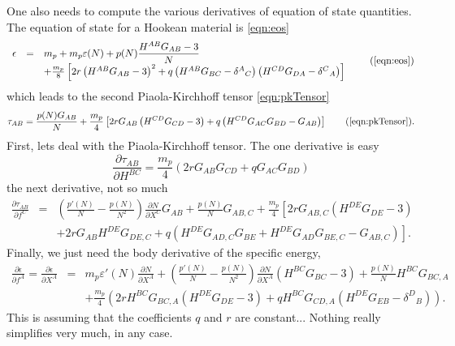 One also needs to compute the various derivatives of equation of state
quantities. The equation of state for a Hookean material is
\eqref{eqn:eos}
\begin{equation}
\begin{array}{rcl}
\epsilon & = & \displaystyle{m_p + m_p\varepsilon(N) + p(N)\frac{H^{AB}G_{AB}-3}{N}} \\
 && + \frac{m_p}{8}\left[ 2r\left(H^{AB}G_{AB}-3\right)^2 + q\left(H^{AB}G_{BC} - \delta^{A}{}_C\right)\left(H^{CD}G_{DA} - \delta^{C}{}_A\right) \right]
 \end{array} \tag{\ref{eqn:eos}}
\end{equation}
which leads to the second Piaola-Kirchhoff tensor \eqref{eqn:pkTensor}
\begin{equation}
\tau_{AB} = \frac{p(N)G_{AB}}{N} +
\frac{m_p}{4}\left[2rG_{AB}\left(H^{CD}G_{CD}-3\right) +
q\left(H^{CD}G_{AC}G_{BD} - G_{AB} \right) \right]
\tag{\ref{eqn:pkTensor}}.
\end{equation}
First, lets deal with the Piaola-Kirchhoff tensor. The one derivative is
easy
\begin{equation}
\frac{\partial \tau_{AB}}{\partial H^{BC}} = 
\frac{m_p}{4}\left(2rG_{AB} G_{CD} +
q G_{AC}G_{BD} \right)
\end{equation}
the next derivative, not so much
\begin{eqnarray}
\nonumber\frac{\partial \tau_{AB}}{\partial f^C} & = & \left( \frac{p'(N)}{N} -
\frac{p(N)}{N^2}\right)\frac{\partial N}{\partial X^C}G_{AB} +
\frac{p(N)}{N} G_{AB,C} +
\frac{m_p}{4}\left[2rG_{AB,C}\left(H^{DE}G_{DE}-3\right)\right. \\
&& \left. + 2rG_{AB}H^{DE}G_{DE,C} +
q\left(H^{DE}G_{AD,C}G_{BE} + H^{DE}G_{AD}G_{BE,C} - G_{AB,C} \right)
\right].
\end{eqnarray}
Finally, we just need the body derivative of the specific energy,
\begin{eqnarray}
\nonumber\frac{\partial \epsilon}{\partial f^A} = \frac{\partial \epsilon}{\partial X^A} & = &
m_p\varepsilon'(N)\frac{\partial N}{\partial X^A} + \left( \frac{p'(N)}{N} - \frac{p(N)}{N^2}\right)
\frac{\partial N}{\partial X^A}(H^{BC}G_{BC} - 3) +
\frac{p(N)}{N}H^{BC}G_{BC,A} \\
&& + \frac{m_p}{4}\left(2rH^{BC}G_{BC,A}(H^{DE}G_{DE}-3) +
qH^{BC}G_{CD,A}(H^{DE}G_{EB} - \delta^D{}_B)\right).
\end{eqnarray}
This is assuming that the coefficients $q$ and $r$ are constant...
Nothing really simplifies very much, in any case.
